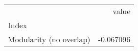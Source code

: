 \begin{tabular}{lr}
\toprule
{} &     value \\
Index                   &           \\
\midrule
Modularity (no overlap) & -0.067096 \\
\bottomrule
\end{tabular}
